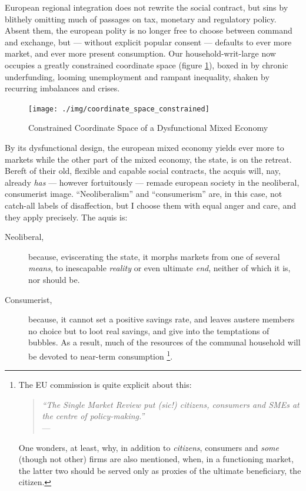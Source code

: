 \documentclass[11pt,a4paper,oneside,openright]{article}
\begin{document}
European regional integration does not rewrite the social contract, but sins by blithely omitting much of passages on tax, monetary and regulatory policy. 
Absent them, the european polity is no longer free to choose between %
command and exchange, but --- without explicit popular consent --- defaults to ever more market, and ever more present consumption. 
Our household-writ-large now occupies a greatly constrained coordinate space (figure \ref{fig:coordinate_space_constrained}), boxed in by chronic underfunding,  looming unemployment and rampant inequality, shaken by recurring imbalances and crises. 

\begin{figure}[htbp]
	\begin{center}
	\texttt{[image: ./img/coordinate\_space\_constrained]}  
	\caption{Constrained Coordinate Space of a Dysfunctional Mixed Economy}
	\label{fig:coordinate_space_constrained}
	\end{center}
\end{figure}

By its dysfunctional design, the european mixed economy yields ever more to markets while the other part of the mixed economy, the state, is on the retreat. 
Bereft of their old, flexible and capable social contracts, the acquis will, nay, already \emph{has} --- however fortuitously --- remade european society in the neoliberal, consumerist image. 
``Neoliberalism'' and ``consumerism'' are, in this case, not catch-all labels of disaffection, but I choose them with equal anger and care, and they apply precisely. 
The aquis is:
\begin{description}
	\item[Neoliberal,] because, eviscerating the state, it morphs markets from one of several \emph{means}, to inescapable \emph{reality} or even ultimate \emph{end}, neither of which it is, nor should be.
	\item[Consumerist,] because, it cannot set a positive savings rate, and leaves austere members no choice but to loot real savings, and give into the temptations of bubbles. 
	As a result, much of the resources of the communal household will be devoted to near-term consumption
	\footnote{
		The \gls{EU} commission is quite explicit about this:
			\begin{quote}
				\emph{``The Single Market Review put \emph{(sic!)} citizens, consumers and \glspl{SME} at the centre of policy-making.''}\\
				--- \cite[3]{Commission2008}	 
			\end{quote} 
		One wonders, at least, why, in addition to \emph{citizens}, consumers and \emph{some} (though not other) firms are also mentioned, when, in a functioning market, the latter two should be served only as proxies of the ultimate beneficiary, the citizen.
	}.
	
\end{description}
\end{document}
